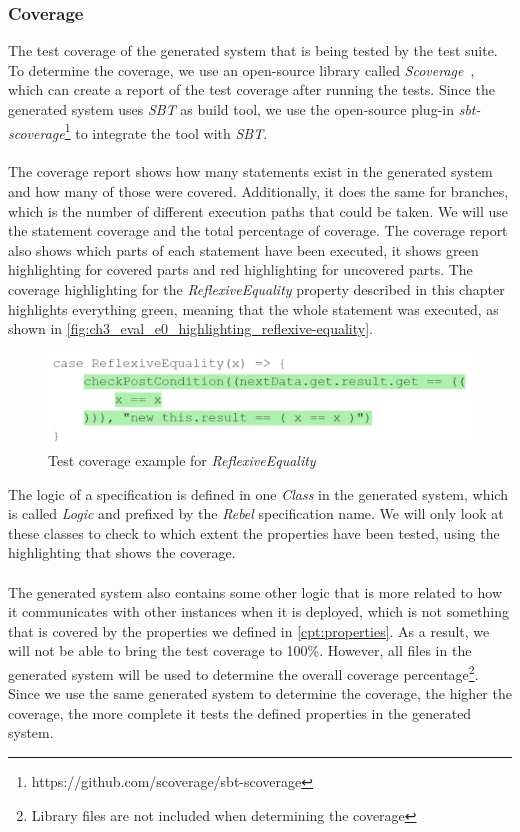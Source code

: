 \subsubsection{Coverage}
The test coverage of the generated system that is being tested by the test
suite. To determine the coverage, we use an open-source library called
\textit{Scoverage}~\cite{siteScoverage2017}, which can create a report of the
test coverage after running the tests. Since the generated system uses
\textit{SBT} as build tool, we use the open-source plug-in
\textit{sbt-scoverage}\footnote{https://github.com/scoverage/sbt-scoverage} to
integrate the tool with \textit{SBT}.\\
\\
The coverage report shows how many statements exist in the generated system and
how many of those were covered. Additionally, it does the same for branches,
which is the number of different execution paths that could be taken. We will
use the statement coverage and the total percentage
of coverage. The coverage report also shows which parts of each statement have
been executed, it shows green highlighting for covered parts and red
highlighting for uncovered parts. The coverage highlighting for the
\textit{ReflexiveEquality} property described in this chapter highlights
everything green, meaning that the whole statement was executed, as shown in
\autoref{fig:ch3_eval_e0_highlighting_reflexive-equality}.
\begin{figure}[!ht]
	\includegraphics[width=\linewidth]{figures/e0_coverage_property_sample}
\caption{Test coverage example for \textit{ReflexiveEquality}}
\label{fig:ch3_eval_e0_highlighting_reflexive-equality}
\centering
\end{figure}
\FloatBarrier
The logic of a specification is defined in one \textit{Class} in the generated
system, which is called \textit{Logic} and prefixed by the \textit{Rebel}
specification name. We will only look at these classes to check to which extent
the properties have been tested, using the highlighting that shows the
coverage.\\
\\
The generated system also contains some other logic that is more related to how
it communicates with other instances when it is deployed, which is not something
that is covered by the properties we defined in \autoref{cpt:properties}. As a
result, we will not be able to bring the test coverage to 100\%. However, all
files in the generated system will be used to determine the overall coverage
percentage\footnote{Library files are not included when determining the coverage}.
Since we use the same generated system to determine the coverage, the higher the
coverage, the more complete it tests the defined properties in the generated
system.

